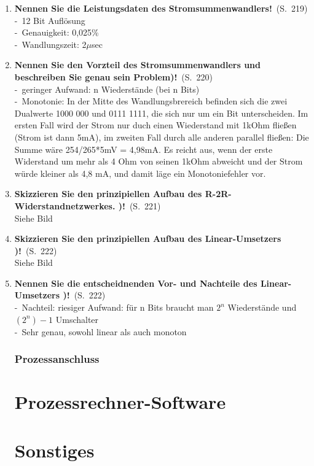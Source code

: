 \documentclass[a4paper,12pt]{article}
\newcommand{\statement}[3]{\pagebreak[3]\item {\textbf{#1!}}\ (S.\ #2)#3}
\newcommand{\catchword}[1]{\\-\ #1}
\newcommand{\normaltext}[1]{\\#1}
\newcommand{\page}[1]{#1}
\begin{document}
\begin{enumerate}
{  }
  
     \statement{Nennen Sie die Leistungsdaten des Stromsummenwandlers}{\page{219}}
  {
    \catchword{12 Bit Auflösung}
    \catchword{Genauigkeit: 0,025\%}
    \catchword{Wandlungszeit: 2$\mu$sec}

  }
  
       \statement{Nennen Sie den Vorzteil des Stromsummenwandlers und beschreiben Sie genau sein Problem)}{\page{220}}
  {
    \catchword{geringer Aufwand: n Wiederstände (bei n Bits)}
    \catchword{Monotonie: In der Mitte des Wandlungsbrereich befinden sich die zwei Dualwerte 1000 000 und 0111 1111, die sich nur um ein Bit unterscheiden. Im ersten Fall wird der Strom nur duch einen Wiederstand mit 1kOhm fließen (Strom ist dann 5mA), im zweiten Fall durch alle anderen parallel fließen: Die Summe wäre 254/265*5mV = 4,98mA. Es reicht aus, wenn der erste Widerstand um mehr als 4 Ohm von seinen 1kOhm abweicht und der Strom würde kleiner als 4,8 mA, und damit läge ein Monotoniefehler vor. }
  }
  
       \statement{Skizzieren Sie den prinzipiellen Aufbau des R-2R-Widerstandnetzwerkes. )}{\page{221}}
  {
    \normaltext{Siehe Bild}

  }
  
        \statement{Skizzieren Sie den prinzipiellen Aufbau des Linear-Umsetzers )}{\page{222}}
  {
    \normaltext{Siehe Bild}

  }
  
         \statement{Nennen Sie die entscheidnenden Vor- und Nachteile des Linear-Umsetzers )}{\page{222}}
  {
    \catchword{Nachteil: riesiger Aufwand: für n Bits braucht man $2^n$ Wiederstände und $(2^n)-1$ Umschalter}
    \catchword{Sehr genau, sowohl linear als auch monoton}

  }
  
    
    \subsubsection{Prozessanschluss}
  
  
  
  
  
  
  
  


  \newpage
  \section{Prozessrechner-Software}


  \newpage
  \section{Sonstiges}


\end{enumerate}
\end{document}
